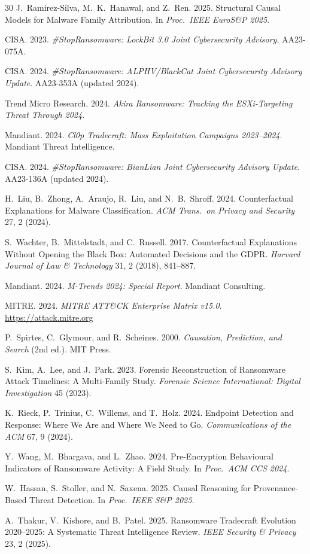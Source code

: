 \documentclass[sigconf,nonacm]{acmart}
\begin{document}
\begin{thebibliography}{30}
J.~Ramirez-Silva, M.~K.~Hanawal, and Z.~Ren. 2025. Structural Causal
Models for Malware Family Attribution. In \textit{Proc.\ IEEE
EuroS\&P 2025}.

CISA. 2023. \textit{\#StopRansomware: LockBit 3.0 Joint Cybersecurity
Advisory}. AA23-075A.

CISA. 2024. \textit{\#StopRansomware: ALPHV/BlackCat Joint
Cybersecurity Advisory Update}. AA23-353A (updated 2024).

Trend Micro Research. 2024. \textit{Akira Ransomware: Tracking the
ESXi-Targeting Threat Through 2024}.

Mandiant. 2024. \textit{Cl0p Tradecraft: Mass Exploitation Campaigns
2023--2024}. Mandiant Threat Intelligence.

CISA. 2024. \textit{\#StopRansomware: BianLian Joint Cybersecurity
Advisory Update}. AA23-136A (updated 2024).

H.~Liu, B.~Zhong, A.~Araujo, R.~Liu, and N.~B.~Shroff. 2024.
Counterfactual Explanations for Malware Classification. \textit{ACM
Trans.\ on Privacy and Security} 27, 2 (2024).

S.~Wachter, B.~Mittelstadt, and C.~Russell. 2017. Counterfactual
Explanations Without Opening the Black Box: Automated Decisions and
the GDPR. \textit{Harvard Journal of Law \& Technology} 31, 2 (2018),
841--887.

Mandiant. 2024. \textit{M-Trends 2024: Special Report}.
Mandiant Consulting.

MITRE. 2024. \textit{MITRE ATT\&CK Enterprise Matrix v15.0}.
\url{https://attack.mitre.org}

P.~Spirtes, C.~Glymour, and R.~Scheines. 2000. \textit{Causation,
Prediction, and Search} (2nd ed.). MIT Press.

S.~Kim, A.~Lee, and J.~Park. 2023. Forensic Reconstruction of
Ransomware Attack Timelines: A Multi-Family Study. \textit{Forensic
Science International: Digital Investigation} 45 (2023).

K.~Rieck, P.~Trinius, C.~Willems, and T.~Holz. 2024. Endpoint
Detection and Response: Where We Are and Where We Need to Go.
\textit{Communications of the ACM} 67, 9 (2024).

Y.~Wang, M.~Bhargava, and L.~Zhao. 2024. Pre-Encryption Behavioural
Indicators of Ransomware Activity: A Field Study.
In \textit{Proc.\ ACM CCS 2024}.

W.~Hassan, S.~Stoller, and N.~Saxena. 2025. Causal Reasoning for
Provenance-Based Threat Detection. In \textit{Proc.\ IEEE S\&P 2025}.

A.~Thakur, V.~Kishore, and B.~Patel. 2025. Ransomware Tradecraft
Evolution 2020--2025: A Systematic Threat Intelligence Review.
\textit{IEEE Security \& Privacy} 23, 2 (2025).

\end{thebibliography}
\end{document}

